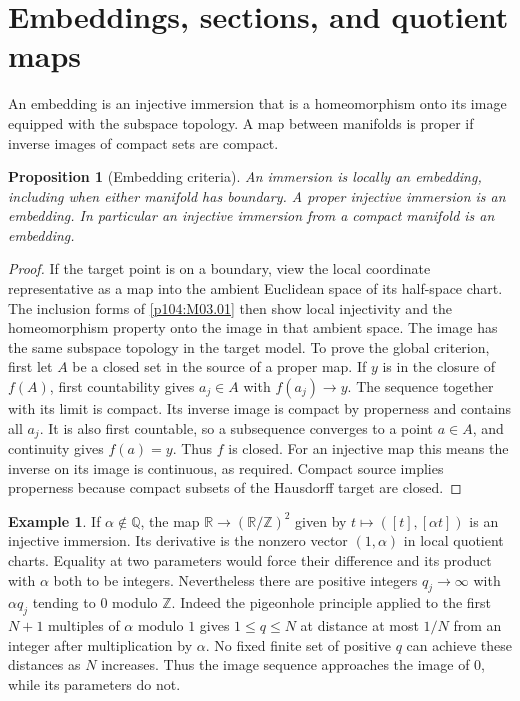 \documentclass[11pt,oneside,openany]{book}
\newtheorem{proposition}[theorem]{Proposition}
\theoremstyle{definition}
\newtheorem{example}[theorem]{Example}
\theoremstyle{remark}
\newcommand{\R}{\mathbb R}
\begin{document}
\section{Embeddings, sections, and quotient maps}

An embedding is an injective immersion that is a homeomorphism
onto its image equipped with the subspace topology. A map
between manifolds is proper if inverse images of compact sets
are compact.

\begin{proposition}[Embedding criteria]\label{p104:M03.02}
An immersion is locally an embedding, including when
either manifold has boundary. A proper injective immersion is an
embedding. In particular an injective immersion from a compact
manifold is an embedding.
\end{proposition}

\begin{proof}
If the target point is on a boundary, view the local
coordinate representative as a map into the ambient
Euclidean space of its half-space chart. The inclusion
forms of \cref{p104:M03.01} then show local injectivity
and the homeomorphism property onto the image in that
ambient space. The image has the same subspace topology
in the target model. To prove the global criterion, first
let \(A\) be a closed set in the source of a proper map.
If \(y\) is in the closure of \(f(A)\), first countability
gives \(a_j\in A\) with \(f(a_j)\to y\). The sequence
together with its limit is compact. Its inverse image
is compact by properness and contains all \(a_j\).
It is also first countable, so a subsequence converges
to a point \(a\in A\), and continuity gives \(f(a)=y\).
Thus \(f\) is closed. For an injective map this means
the inverse on its image is continuous, as required.
Compact source implies properness because compact
subsets of the Hausdorff target are closed.
\end{proof}

\begin{example}
If \(\alpha\notin\mathbb Q\), the map
\(\R\to(\R/\mathbb Z)^2\) given by
\(t\mapsto([t],[\alpha t])\) is an injective immersion.
Its derivative is the nonzero vector \((1,\alpha)\)
in local quotient charts. Equality at two parameters
would force their difference and its product with
\(\alpha\) both to be integers. Nevertheless there are
positive integers \(q_j\to\infty\) with
\(\alpha q_j\) tending to \(0\) modulo \(\mathbb Z\).
Indeed the pigeonhole principle applied to the first
\(N+1\) multiples of \(\alpha\) modulo \(1\) gives
\(1\leq q\leq N\) at distance at most \(1/N\) from an
integer after multiplication by \(\alpha\). No fixed
finite set of positive \(q\) can achieve these distances
as \(N\) increases. Thus the image sequence approaches
the image of \(0\), while its parameters do not.
\end{example}
\end{document}
